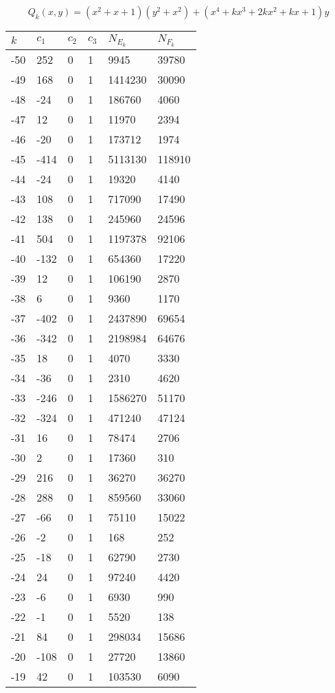 \documentclass{amsart}
\begin{document}
\clearpage
$$Q_k(x,y)=(x^2 + x + 1)(y^2+x^2) + (x^4 + kx^3 + 2kx^2 + kx + 1)y$$
\begin{longtable}{llllll}
\hline
$k$ & $c_1$ & $c_2$ & $c_3$ & $N_{E_k}$ & $N_{F_k}$\\
\hline
-50 & 252 & 0 & 1 & 9945 & 39780\\
-49 & 168 & 0 & 1 & 1414230 & 30090\\
-48 & -24 & 0 & 1 & 186760 & 4060\\
-47 & 12 & 0 & 1 & 11970 & 2394\\
-46 & -20 & 0 & 1 & 173712 & 1974\\
-45 & -414 & 0 & 1 & 5113130 & 118910\\
-44 & -24 & 0 & 1 & 19320 & 4140\\
-43 & 108 & 0 & 1 & 717090 & 17490\\
-42 & 138 & 0 & 1 & 245960 & 24596\\
-41 & 504 & 0 & 1 & 1197378 & 92106\\
-40 & -132 & 0 & 1 & 654360 & 17220\\
-39 & 12 & 0 & 1 & 106190 & 2870\\
-38 & 6 & 0 & 1 & 9360 & 1170\\
-37 & -402 & 0 & 1 & 2437890 & 69654\\
-36 & -342 & 0 & 1 & 2198984 & 64676\\
-35 & 18 & 0 & 1 & 4070 & 3330\\
-34 & -36 & 0 & 1 & 2310 & 4620\\
-33 & -246 & 0 & 1 & 1586270 & 51170\\
-32 & -324 & 0 & 1 & 471240 & 47124\\
-31 & 16 & 0 & 1 & 78474 & 2706\\
-30 & 2 & 0 & 1 & 17360 & 310\\
-29 & 216 & 0 & 1 & 36270 & 36270\\
-28 & 288 & 0 & 1 & 859560 & 33060\\
-27 & -66 & 0 & 1 & 75110 & 15022\\
-26 & -2 & 0 & 1 & 168 & 252\\
-25 & -18 & 0 & 1 & 62790 & 2730\\
-24 & 24 & 0 & 1 & 97240 & 4420\\
-23 & -6 & 0 & 1 & 6930 & 990\\
-22 & -1 & 0 & 1 & 5520 & 138\\
-21 & 84 & 0 & 1 & 298034 & 15686\\
-20 & -108 & 0 & 1 & 27720 & 13860\\
-19 & 42 & 0 & 1 & 103530 & 6090\\

\end{longtable}
\end{document}
